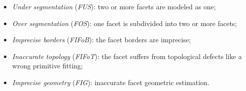 \documentclass[conference]{IEEEtran}
\begin{document}
        \begin{itemize}
        	\item \textit{Under segmentation} (\textit{FUS}): two or more facets are modeled as one;
            \item \textit{Over segmentation} (\textit{FOS}): one facet is subdivided into two or more facets;
            \item \textit{Imprecise borders} (\textit{FIFoB}): the facet borders are imprecise;
            \item \textit{Inaccurate topology} (\textit{FIFoT}): the facet suffers from topological defects like a wrong primitive fitting;
            \item \textit{Imprecise geometry} (\textit{FIG}): inaccurate facet geometric estimation.
        \end{itemize}
\end{document}

